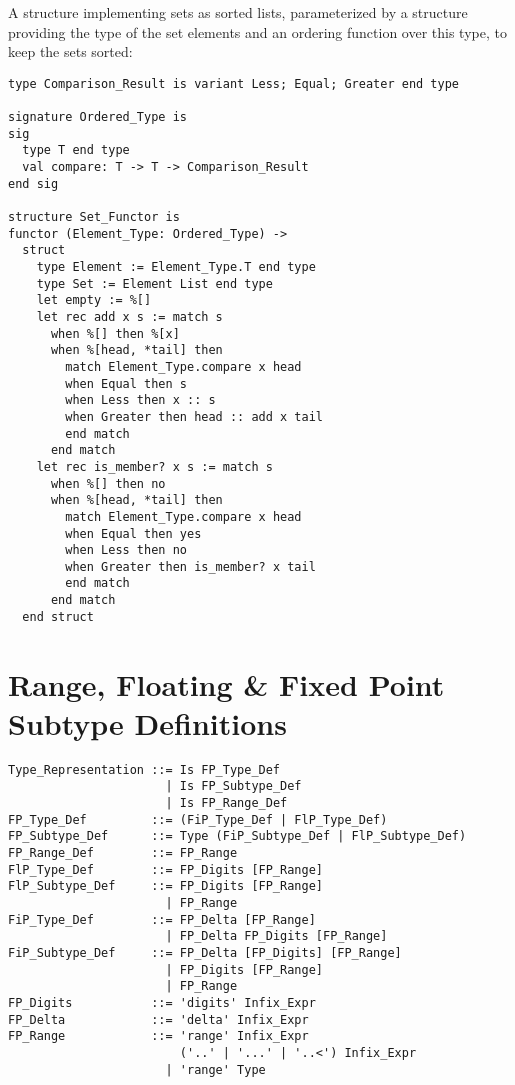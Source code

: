 \example A structure implementing sets as sorted lists, parameterized by a structure providing the type of the set elements and an ordering function over this type, to keep the sets sorted:
\begin{lstlisting}
type Comparison_Result is variant Less; Equal; Greater end type

signature Ordered_Type is
sig
  type T end type
  val compare: T -> T -> Comparison_Result
end sig

structure Set_Functor is
functor (Element_Type: Ordered_Type) ->
  struct
    type Element := Element_Type.T end type
    type Set := Element List end type
    let empty := %[]
    let rec add x s := match s
      when %[] then %[x]
      when %[head, *tail] then 
        match Element_Type.compare x head
        when Equal then s
        when Less then x :: s
        when Greater then head :: add x tail
        end match
      end match
    let rec is_member? x s := match s
      when %[] then no
      when %[head, *tail] then 
        match Element_Type.compare x head
        when Equal then yes
        when Less then no
        when Greater then is_member? x tail
        end match
      end match
  end struct
\end{lstlisting}





\section{Range, Floating \& Fixed Point Subtype Definitions}
\label{sec:fl-fi-subtypes}

\syntax\begin{lstlisting}
Type_Representation ::= Is FP_Type_Def 
                      | Is FP_Subtype_Def 
                      | Is FP_Range_Def
FP_Type_Def         ::= (FiP_Type_Def | FlP_Type_Def) 
FP_Subtype_Def      ::= Type (FiP_Subtype_Def | FlP_Subtype_Def) 
FP_Range_Def        ::= FP_Range
FlP_Type_Def        ::= FP_Digits [FP_Range]
FlP_Subtype_Def     ::= FP_Digits [FP_Range]
                      | FP_Range
FiP_Type_Def        ::= FP_Delta [FP_Range] 
                      | FP_Delta FP_Digits [FP_Range]
FiP_Subtype_Def     ::= FP_Delta [FP_Digits] [FP_Range]
                      | FP_Digits [FP_Range]
                      | FP_Range
FP_Digits           ::= 'digits' Infix_Expr
FP_Delta            ::= 'delta' Infix_Expr
FP_Range            ::= 'range' Infix_Expr 
                        ('..' | '...' | '..<') Infix_Expr
                      | 'range' Type
\end{lstlisting}

